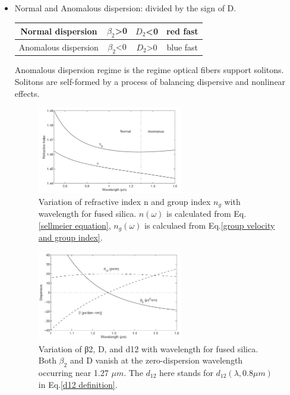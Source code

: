 \documentclass[12pt]{extarticle}
\newcommand{\<}{\langle}
\renewcommand{\>}{\rangle}
\theoremstyle{definition}
\begin{document}
\begin{itemize}
                \item Normal and Anomalous dispersion: divided by the sign of D.
                    \begin{table}[htbp]
                    \centering
                    \begin{tabular}{|c|c|c|c|}
                        \hline
                        Normal dispersion    & $\beta_2$\textgreater{}0 & $D_2$\textless{}0    & red fast  \\ \hline
                        Anomalous dispersion & $\beta_2$\textless{}0    & $D_2$\textgreater{}0 & blue fast \\ \hline
                    \end{tabular}
                    \end{table}
                    Anomalous dispersion regime is the regime optical fibers support solitons. Solitons are self-formed by a process of balancing dispersive and nonlinear effects.
                    \begin{figure}[htbp]
                        \centering
                        \includegraphics[width=0.6\textwidth]{images/fig1.4.PNG}
                        \caption{Variation of refractive index n and group index $n_g$ with wavelength for fused silica. $n(\omega)$ is calculated from Eq.\ref{sellmeier equation}, $n_g(\omega)$ is calculaed from Eq.\ref{group velocity and group index}.}
                        \label{fig1.4}
                    \end{figure}
                    
                    \begin{figure}[htbp]
                        \centering
                        \includegraphics[width=0.6\textwidth]{images/fig1.5.PNG}
                        \caption{Variation of β2, D, and d12 with wavelength for fused silica. Both $\beta_2$ and D vanish at the zero-dispersion wavelength occurring near 1.27 $\mu m$. The $d_{12}$ here stands for $d_{12}(\lambda, 0.8\mu m)$ in Eq.\ref{d12 definition}.}
                        \label{fig1.5}
                    \end{figure}
                    

\end{itemize}
\end{document}
